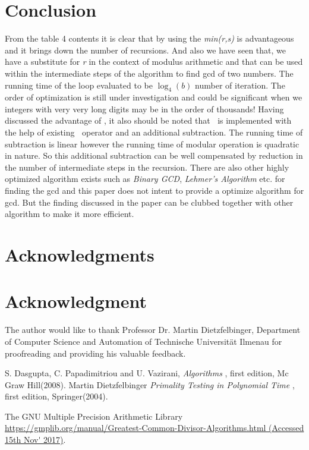 \documentclass[conference]{IEEEtran}
\newcommand{\var}[1]{\textit{#1}}
\renewcommand{\mod}{\text{mod}}
\newcommand{\moddashdash}{\text{mod''}}
\begin{document}
\section{Conclusion}
From the table 4 contents it is clear that by using the \var{min(r,s)} is advantageous and it brings down the number of recursions. And also we have seen that, we have a substitute for \var{r} in the context of modulus arithmetic and that can be used within the intermediate steps of the algorithm to find gcd of two numbers. The running time of the loop evaluated to be $\log_4(b)$ number of iteration. The order of optimization is still under investigation and could be significant when we integers with very very long digits may be in the order of thousands! Having discussed the advantage of \moddashdash, it also should be noted that \moddashdash $\>$ is implemented with the help of existing \mod $\>$ operator and an additional subtraction. The running time of subtraction is linear however the running time of modular operation is quadratic in nature. So this additional subtraction can be well compensated by reduction in the number of intermediate steps in the recursion. There are also other highly optimized algorithm exists such as \var{Binary GCD}, \var{Lehmer's Algorithm} etc. for finding the gcd and this paper does not intent to provide a optimize algorithm for gcd. But the finding discussed in the paper can be clubbed together with other algorithm to make it more efficient.

\ifCLASSOPTIONcompsoc
  \section*{Acknowledgments}
\else
  \section*{Acknowledgment}
\fi
The author would like to thank Professor Dr. Martin Dietzfelbinger, Department of Computer Science and Automation of Technische Universität Ilmenau for proofreading and providing his valuable feedback.

\begin{thebibliography}{6}

S. Dasgupta, C. Papadimitriou and U. Vazirani, \textsl{Algorithms
},
first edition, Mc Graw Hill(2008).
Martin Dietzfelbinger \textsl{Primality Testing in Polynomial Time
},
first edition, Springer(2004).

The GNU Multiple Precision Arithmetic Library \url{https://gmplib.org/manual/Greatest-Common-Divisor-Algorithms.html (Accessed 15th Nov' 2017)}.

\end{thebibliography}

\end{document}
